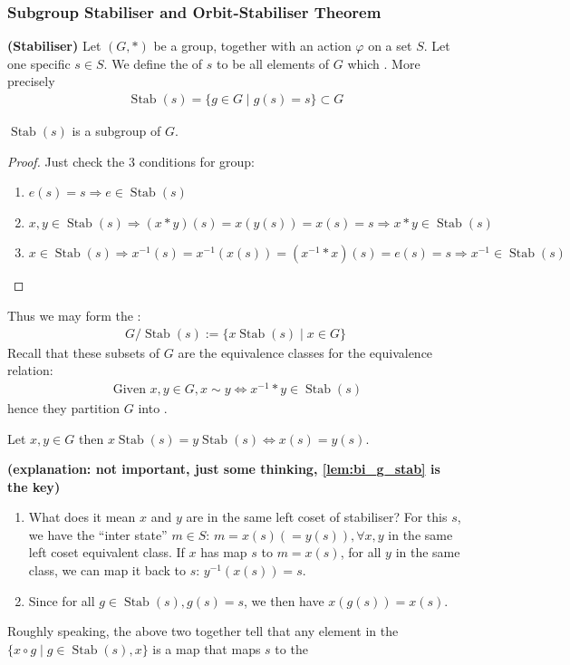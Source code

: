 \documentclass{article}
\newcommand{\bfs}[1]{\textbf{({#1}) }}
\newcommand{\Stab}{\operatorname{Stab}}
\begin{document}
\subsubsection{Subgroup Stabiliser and Orbit-Stabiliser Theorem}
\begin{defa}{\bfs{Stabiliser}}
Let $(G, *)$ be a group, together with an action $\varphi$ on a set $S .$ Let one specific $s \in S$. We define the  of $s$ to be all elements of $G$ which . More precisely
\begin{align*}
\Stab(s)=\{g \in G \mid g(s)=s\} \subset G
\end{align*}
\end{defa} 
\begin{lema}
$\Stab(s)$ is a subgroup of $G$.
\end{lema} 
\begin{proof}Just check the 3 conditions for group:
\begin{enumerate}
    \item $e(s)=s \Rightarrow e \in \Stab(s)$
    \item $x, y \in  \Stab(s) \Rightarrow(x * y)(s)=x(y(s))=x(s)=s \Rightarrow x * y \in \operatorname{Stab}(s)$
    \item $x \in \Stab(s) \Rightarrow x^{-1}(s)=x^{-1}(x(s))=\left(x^{-1} * x\right)(s)=e(s)=s \Rightarrow x^{-1} \in \operatorname{Stab}(s)$
\end{enumerate} 
\end{proof}
Thus we may form the :
\begin{align*}
G / \Stab(s):=\{x \operatorname{Stab}(s) \mid x \in G\}
\end{align*}
Recall that these subsets of $G$ are the equivalence classes for the equivalence relation:
\begin{align*}
\text { Given } x, y \in G, x \sim y \Longleftrightarrow x^{-1} * y \in \Stab(s)
\end{align*}
hence they partition $G$ into .
\begin{lema}
Let $x, y \in G$ then $x \Stab (s)=y \Stab(s) \Longleftrightarrow x(s)=y(s)$.
\end{lema} 
\begin{rema}\bfs{explanation: not important, just some thinking, \cref{lem:bi_g_stab} is the key}
\begin{enumerate}
    \item What does it mean $x$ and $y$ are in the same left coset of stabiliser? For this $s$, we have the ``inter state'' $m\in S$: $m=x(s)(=y(s)),\forall x, y $ in the same left coset equivalent class. If $x$ has map $s$ to $m=x(s)$, for all $y$ in the same class, we can map it back to $s$: $y^{-1}(x(s))=s$.
    \item Since for all $g\in\Stab(s), g(s)=s$, we then have $x(g(s))=x(s)$. 
\end{enumerate}
Roughly speaking, the above two together tell that  any element in the  $\{x\circ g\mid g\in \Stab(s), x\}$ is a map that maps $s$ to the 
\end{rema}
\end{document}

